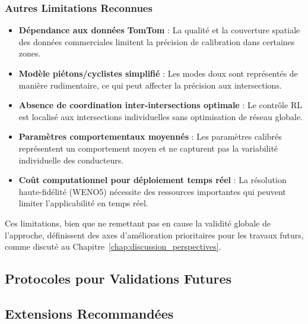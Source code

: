 \subsubsection{Autres Limitations Reconnues}
\begin{itemize}
  \item \textbf{Dépendance aux données TomTom} : La qualité et la couverture spatiale des données commerciales limitent la précision de calibration dans certaines zones.
  \item \textbf{Modèle piétons/cyclistes simplifié} : Les modes doux sont représentés de manière rudimentaire, ce qui peut affecter la précision aux intersections.
  \item \textbf{Absence de coordination inter-intersections optimale} : Le contrôle RL est localisé aux intersections individuelles sans optimisation de réseau globale.
  \item \textbf{Paramètres comportementaux moyennés} : Les paramètres calibrés représentent un comportement moyen et ne capturent pas la variabilité individuelle des conducteurs.
  \item \textbf{Coût computationnel pour déploiement temps réel} : La résolution haute-fidélité (WENO5) nécessite des ressources importantes qui peuvent limiter l'applicabilité en temps réel.
\end{itemize}

Ces limitations, bien que ne remettant pas en cause la validité globale de l'approche, définissent des axes d'amélioration prioritaires pour les travaux futurs, comme discuté au Chapitre~\ref{chap:discussion_perspectives}.

\subsection{Protocoles pour Validations Futures}
\label{subsec:protocoles_futurs}

\subsection{Extensions Recommandées}
\label{subsec:extensions_recommandees}

